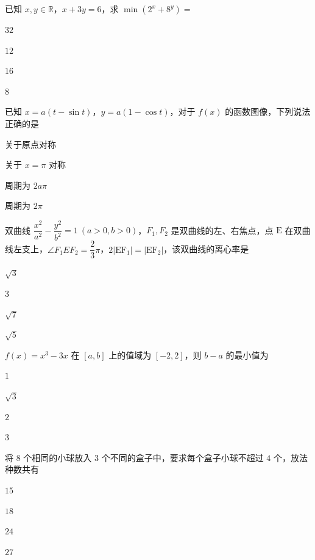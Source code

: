 \documentclass{exam-zh}
\begin{document}
\begin{question}
已知 $x,y\in\mathbb{R}$，$x+3y=6$，求 $\min\left(2^x+8^y\right)=$ \paren[]
\begin{choices}
  \item $32$
  \item $12$
  \item $16$
  \item $8$
\end{choices}
\end{question}

\begin{question}
已知 $x=a(t-\sin t)$，$y=a(1-\cos t)$，对于 $f(x)$ 的函数图像，下列说法正确的是 \paren[]
\begin{choices}
  \item 关于原点对称
  \item 关于 $x=\pi$ 对称
  \item 周期为 $2a\pi$
  \item 周期为 $2\pi$
\end{choices}
\end{question}

\begin{question}
双曲线 $\dfrac{x^2}{a^2}-\dfrac{y^2}{b^2}=1\ (a>0,b>0)$，$F_1,F_2$ 是双曲线的左、右焦点，点 $\mathrm{E}$ 在双曲线左支上，$\angle F_1EF_2=\dfrac{2}{3}\pi$，$2|\mathrm{EF}_1|=|\mathrm{EF}_2|$，该双曲线的离心率是 \paren[]
\begin{choices}
  \item $\sqrt{3}$
  \item $3$
  \item $\sqrt{7}$
  \item $\sqrt{5}$
\end{choices}
\end{question}

\begin{question}
$f(x)=x^3-3x$ 在 $[a,b]$ 上的值域为 $[-2,2]$，则 $b-a$ 的最小值为 \paren[]
\begin{choices}
  \item $1$
  \item $\sqrt{3}$
  \item $2$
  \item $3$
\end{choices}
\end{question}

\begin{question}
将 $8$ 个相同的小球放入 $3$ 个不同的盒子中，要求每个盒子小球不超过 $4$ 个，放法种数共有 \paren[]
\begin{choices}
  \item $15$
  \item $18$
  \item $24$
  \item $27$
\end{choices}
\end{question}
\end{document}
